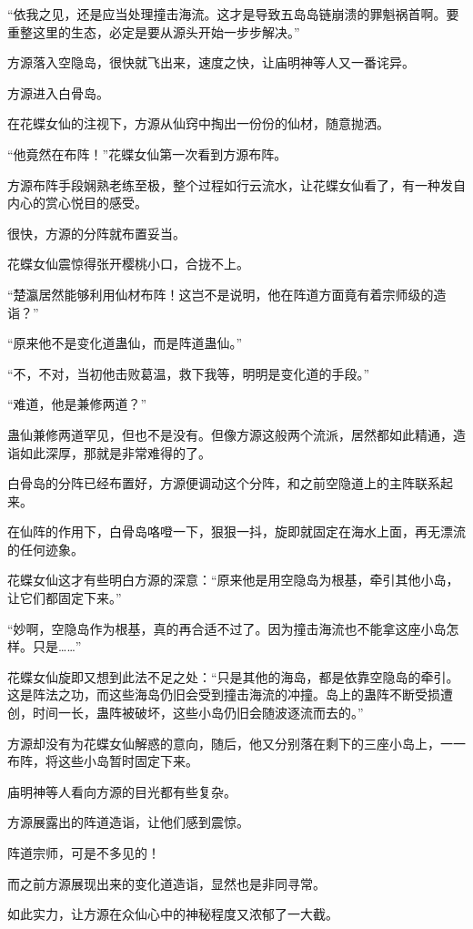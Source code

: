 \begin{this_body}
“依我之见，还是应当处理撞击海流。这才是导致五岛岛链崩溃的罪魁祸首啊。要重整这里的生态，必定是要从源头开始一步步解决。”

方源落入空隐岛，很快就飞出来，速度之快，让庙明神等人又一番诧异。

方源进入白骨岛。

在花蝶女仙的注视下，方源从仙窍中掏出一份份的仙材，随意抛洒。

“他竟然在布阵！”花蝶女仙第一次看到方源布阵。

方源布阵手段娴熟老练至极，整个过程如行云流水，让花蝶女仙看了，有一种发自内心的赏心悦目的感受。

很快，方源的分阵就布置妥当。

花蝶女仙震惊得张开樱桃小口，合拢不上。

“楚瀛居然能够利用仙材布阵！这岂不是说明，他在阵道方面竟有着宗师级的造诣？”

“原来他不是变化道蛊仙，而是阵道蛊仙。”

“不，不对，当初他击败葛温，救下我等，明明是变化道的手段。”

“难道，他是兼修两道？”

蛊仙兼修两道罕见，但也不是没有。但像方源这般两个流派，居然都如此精通，造诣如此深厚，那就是非常难得的了。

白骨岛的分阵已经布置好，方源便调动这个分阵，和之前空隐道上的主阵联系起来。

在仙阵的作用下，白骨岛咯噔一下，狠狠一抖，旋即就固定在海水上面，再无漂流的任何迹象。

花蝶女仙这才有些明白方源的深意：“原来他是用空隐岛为根基，牵引其他小岛，让它们都固定下来。”

“妙啊，空隐岛作为根基，真的再合适不过了。因为撞击海流也不能拿这座小岛怎样。只是……”

花蝶女仙旋即又想到此法不足之处：“只是其他的海岛，都是依靠空隐岛的牵引。这是阵法之功，而这些海岛仍旧会受到撞击海流的冲撞。岛上的蛊阵不断受损遭创，时间一长，蛊阵被破坏，这些小岛仍旧会随波逐流而去的。”

方源却没有为花蝶女仙解惑的意向，随后，他又分别落在剩下的三座小岛上，一一布阵，将这些小岛暂时固定下来。

庙明神等人看向方源的目光都有些复杂。

方源展露出的阵道造诣，让他们感到震惊。

阵道宗师，可是不多见的！

而之前方源展现出来的变化道造诣，显然也是非同寻常。

如此实力，让方源在众仙心中的神秘程度又浓郁了一大截。


\end{this_body}
